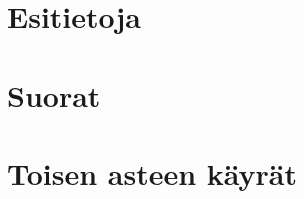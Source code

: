 \chapter{Esitietoja}
	
	
	
	

\chapter{Suorat}
	
	
	
	

\chapter{Toisen asteen käyrät}
	
	
	
	
	
	
	
